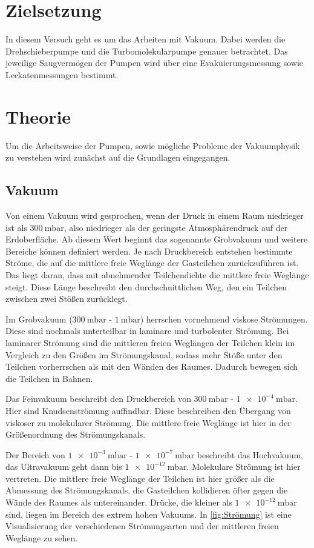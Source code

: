 \section{Zielsetzung}
    In diesem Versuch geht es um das Arbeiten mit Vakuum.
    Dabei werden die Drehschieberpumpe und die Turbomolekularpumpe genauer betrachtet.
    Das jeweilige Saugvermögen der Pumpen wird über eine Evakuierungsmessung sowie Leckatenmessungen bestimmt.

\section{Theorie}
\label{sec:Theorie}
    Um die Arbeitsweise der Pumpen, sowie mögliche Probleme der Vakuumphysik zu verstehen wird zunächst auf die Grundlagen eingegangen.
    \subsection{Vakuum}
        Von einem Vakuum wird gesprochen, wenn der Druck in einem Raum niedrieger ist als $\SI{300}{\milli\bar}$, also niedrieger als der geringste Atmosphärendruck auf der Erdoberfläche. \cite{Pfeiffer}
        Ab diesem Wert beginnt das sogenannte Grobvakuum und weitere Bereiche können definiert werden.
        Je nach Druckbereich entstehen bestimmte Ströme, die auf die mittlere freie Weglänge der Gasteilchen zurückzuführen ist.
        Das liegt daran, dass mit abnehmender Teilchendichte die mittlere freie Weglänge steigt.
        Diese Länge beschreibt den durchschnittlichen Weg, den ein Teilchen zwischen zwei Stößen zurücklegt. 

        \noindent
        Im Grobvakuum ($\SI{300}{\milli\bar}$ - $\SI{1}{\milli\bar}$) herrschen vornehmend viskose Strömungen.
        Diese sind nochmals unterteilbar in laminare und turbolenter Strömung.
        Bei laminarer Strömung sind die mittleren freien Weglängen der Teilchen klein im Vergleich zu den Größen im Strömungskanal, sodass mehr Stöße unter den Teilchen vorherrschen als mit den Wänden des Raumes.
        Dadurch bewegen sich die Teilchen in Bahnen.

        \noindent
        Das Feinvakuum beschreibt den Druckbereich von $\SI{300}{\milli\bar}$ - $\SI{1e-4}{\milli\bar}$.
        Hier sind Knudsenströmung auffindbar. \cite{Pfeiffer}
        Diese beschreiben den Übergang von viskoser zu molekularer Strömung.
        Die mittlere freie Weglänge ist hier in der Größenordnung des Strömungskanals.

        \noindent
        Der Bereich von $\SI{1e-3}{\milli\bar}$ - $\SI{1e-7}{\milli\bar}$ beschreibt das Hochvakuum, das Ultravakuum geht dann bis $\SI{1e-12}{\milli\bar}$.
        Molekulare Strömung ist hier vertreten.
        Die mittlere freie Weglänge der Teilchen ist hier größer als die Abmessung des Strömungskanals, die Gasteilchen kollidieren öfter gegen die Wände des Raumes als untereinander.
        \noindent
        Drücke, die kleiner als $\SI{1e-12}{\milli\bar}$ sind, liegen im Bereich des extrem hohen Vakuums.
        \noindent
        In \autoref{fig:Strömung} ist eine Visualisierung der verschiedenen Strömungsarten und der mittleren freien Weglänge zu sehen.

